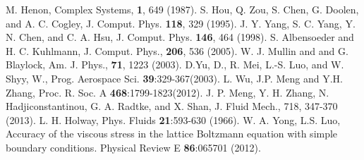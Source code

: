 \documentclass[doublecol]{epl2}
\begin{document}
\begin{thebibliography}{0}
 M. Henon, Complex Systems, {\bf 1}, 649 (1987).
 S. Hou, Q. Zou, S. Chen, G. Doolen, and A. C. Cogley, J. Comput. Phys. {\bf 118}, 329 (1995).
 J. Y. Yang, S. C. Yang, Y. N. Chen, and C. A. Hsu, J. Comput. Phys. {\bf 146}, 464 (1998).
 S. Albensoeder and H. C. Kuhlmann, J. Comput. Phys., {\bf 206}, 536 (2005).
 W. J. Mullin and and G. Blaylock, Am. J. Phys., {\bf 71}, 1223 (2003).
 D.Yu, D., R. Mei, L.-S. Luo, and W. Shyy, W., Prog. Aerospace Sci. {\bf 39}:329-367(2003).
 L. Wu, J.P. Meng  and Y.H. Zhang, Proc. R. Soc. A {\bf 468}:1799-1823(2012).
 J. P. Meng, Y. H. Zhang, N. Hadjiconstantinou, G. A. Radtke, and X. Shan, J. Fluid Mech., 718, 347-370 (2013).
 L. H. Holway, Phys. Fluids {\bf 21}:593-630 (1966).
 W. A. Yong, L.S. Luo, Accuracy of the viscous stress in the lattice Boltzmann equation with simple boundary conditions. Physical Review E {\bf 86}:065701 (2012).

\end{thebibliography}
\end{document}
